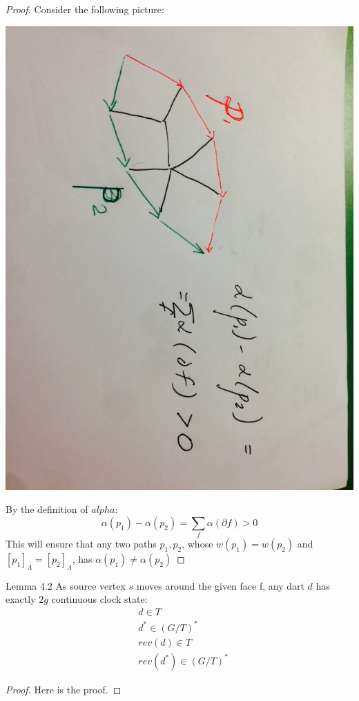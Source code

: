\documentclass{article}
\begin{document}
\begin{proof}
Consider the following picture:
\begin{center}
\includegraphics[angle = 90, scale = 0.3]{figures/alphaNec.jpg}
\end{center}
By the definition of $alpha$:
\[\alpha(p_1) - \alpha(p_2) = \sum_f \alpha(\partial f) > 0\]
This will ensure that any two paths $p_1, p_2$, whose $w(p_1) = w(p_2)$ and 
$[p_1]_{\Lambda} = [p_2]_{\Lambda}$, has $\alpha(p_1) \neq \alpha(p_2)$

\end{proof}

\begin{oneshot}{Lemma 4.2}
As source vertex $s$ moves around the given face f, any dart $d$ has exactly
$2g$ continuous clock state: 
\begin{align*}
& d \in T \\
& d^{*} \in (G/T)^{*} \\
& rev(d) \in T \\
& rev(d^{*}) \in (G/T)^{*}
\end{align*}
\end{oneshot}
\begin{proof}
Here is the proof.
\end{proof}
\end{document}
